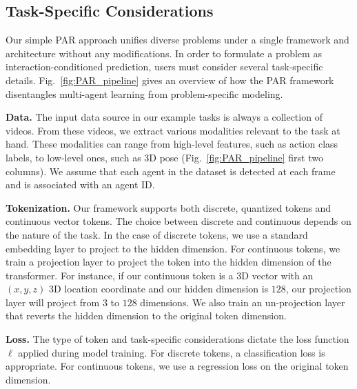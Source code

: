 \subsection{Task-Specific Considerations}
\label{sec:task-specific}
Our simple PAR approach unifies diverse problems under a single framework and architecture without any modifications. In order to formulate a problem as interaction-conditioned prediction, users must consider several task-specific details. Fig.~\ref{fig:PAR_pipeline} gives an overview of how the PAR framework disentangles multi-agent learning from problem-specific modeling.

\medskip \noindent \textbf{Data.} The input data source in our example tasks is always a collection of videos. From these videos, we extract various modalities relevant to the task at hand. These modalities can range from high-level features, such as action class labels, to low-level ones, such as 3D pose (Fig.~\ref{fig:PAR_pipeline} first two columns). We assume that each agent in the dataset is detected at each frame and is associated with an agent ID.
 
\medskip \noindent \textbf{Tokenization.} Our framework supports both discrete, quantized tokens and continuous vector tokens. The choice between discrete and continuous depends on the nature of the task.  
In the case of discrete tokens, we use a standard embedding layer to project to the hidden dimension. For continuous tokens, we train a projection layer to project the token into the hidden dimension of the transformer. For instance, if our continuous token is a 3D vector with an $(x,y,z)$ 3D location coordinate and our hidden dimension is $128$, our projection layer will project from $3$ to $128$ dimensions. We also train an un-projection layer that reverts the hidden dimension to the original token dimension.

\medskip \noindent \textbf{Loss.} The type of token and task-specific considerations dictate the loss function $\ell$ applied during model training. For discrete tokens, a classification loss is appropriate. For continuous tokens, we use a regression loss on the original token dimension. 

